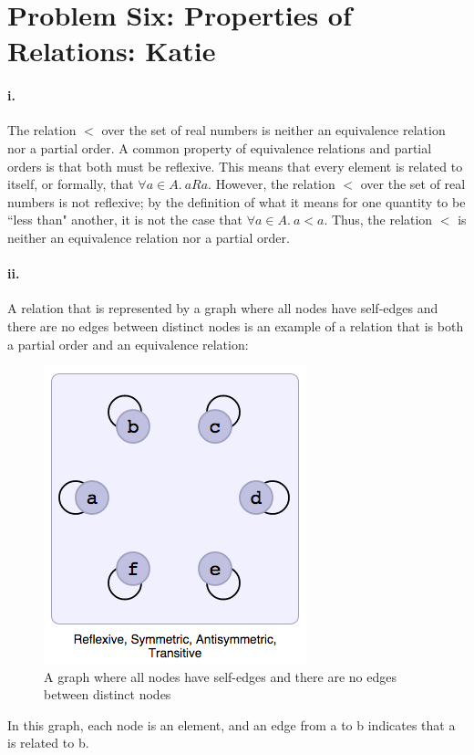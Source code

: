 \documentclass[10pt,letter]{article}
\begin{document}
\pagebreak
\section*{Problem Six: Properties of Relations: Katie}

\paragraph{i.} The relation $<$ over the set of real numbers is neither an equivalence relation nor a partial order. A common property of equivalence relations and partial orders is that both must be reflexive. This means that every element is related to itself, or formally, that $\forall a \in A.\ aRa$. However, the relation $<$ over the set of real numbers is not reflexive; by the definition of what it means for one quantity to be ``less than" another, it is not the case that $\forall a \in A.\ a<a$. Thus, the relation $<$ is neither an equivalence relation nor a partial order. 

\paragraph{ii.} A relation that is represented by a graph where all nodes have self-edges and there are no edges between distinct nodes is an example of a relation that is both a partial order and an equivalence relation:

\begin{figure}[h]
\centering
  \includegraphics[width=0.45\linewidth]{hw4_6ii.png}
  \caption{A graph where all nodes have self-edges and there are no edges between distinct nodes}
  \label{fig:q6ii}
\end{figure}

In this graph, each node is an element, and an edge from a to b indicates that a is related to b. 
\end{document}
